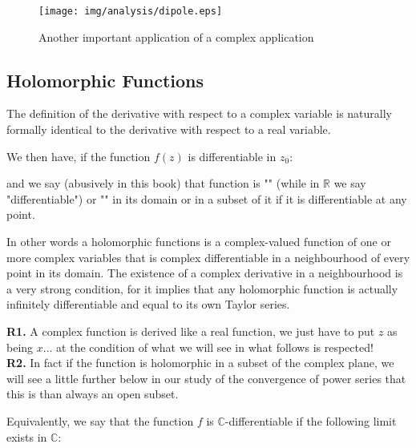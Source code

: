 	\pagebreak
	\begin{tcolorbox}[colframe=black,colback=white,sharp corners]
	\begin{figure}[H]
		\begin{center}
			\texttt{[image: img/analysis/dipole.eps]}
		\end{center}	
		\caption{Another important application of a complex application}
	\end{figure}
	\end{tcolorbox}
	
	\subsection{Holomorphic Functions}\label{holomorphic functions}
	The definition of the derivative with respect to a complex variable is naturally formally identical to the derivative with respect to a real variable.
	
	We then have, if the function $f(z)$ is differentiable in $z_0$:
	
	and we say (abusively in this book) that function is "" (while in $\mathbb{R}$ we say "differentiable") or "" in its domain or in a subset of it if it is differentiable at any point.
	
	In other words a holomorphic functions is a complex-valued function of one or more complex variables that is complex differentiable in a neighbourhood of every point in its domain. The existence of a complex derivative in a neighbourhood is a very strong condition, for it implies that any holomorphic function is actually infinitely differentiable and equal to its own Taylor series.
	
	\begin{tcolorbox}[title=Remarks,colframe=black,arc=10pt]
	\textbf{R1.} A complex function is derived like a real function, we just have to put $z$ as being $x$... at the condition of what we will see in what follows is respected!\\
	
	\textbf{R2.} In fact if the function is holomorphic in a subset of the complex plane, we will see a little further below in our study of the convergence of power series that this is than always an open subset.
	\end{tcolorbox}
	Equivalently, we say that the function $f$ is $\mathbb{C}$-differentiable if the following limit exists in  $\mathbb{C}$:
	
